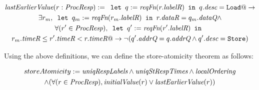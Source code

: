 \begin{defn}
\begin{multline*}
\textit{lastEarlierValue} (r: \textit{ProcResp}) := \texttt{ let } q := \textit{reqFn} (r.\textit{labelR}) \texttt{ in }
q.\textit{desc} = \texttt{Load} @-> \\ \exists r_m, \texttt{ let } q_m := \textit{reqFn} (r_m.\textit{labelR}) \texttt{ in }
r.\textit{dataR} = q_m.\textit{dataQ} \wedge \\
\forall (r' \in \textit{ProcResp}), \texttt{ let } q' := \textit{reqFn} (r'.\textit{labelR}) \texttt{ in } \\ r_m.\textit{timeR} \le r'.\textit{timeR} < r.\textit{timeR} @->
\neg (q'.\textit{addrQ} = q.\textit{addrQ} \wedge q'.\textit{desc} = \texttt{Store})
\end{multline*}
\end{defn}

Using the above definitions, we can define the store-atomicity theorem as follows:
\begin{thm}
\begin{multline*}
storeAtomicity := 
\textit{uniqRespLabels} \wedge
\textit{uniqStRespTimes} \wedge \textit{localOrdering}\\ \wedge 
(\forall (r \in \textit{ProcResp}), \textit{initialValue}(r) \vee \textit{lastEarlierValue}(r))
\end{multline*}
\end{thm}
